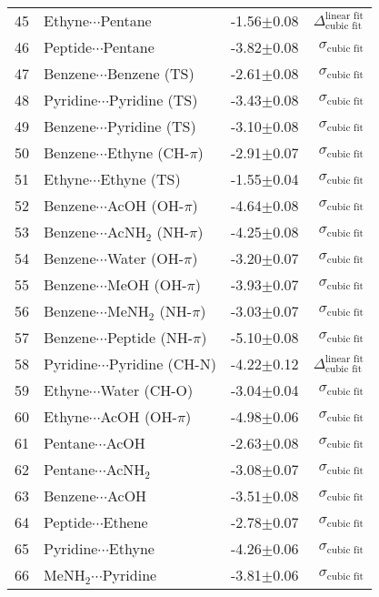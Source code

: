 \begin{longtable}{llrr}
45 & Ethyne$\cdots$Pentane & -1.56$\pm$0.08 & $\Delta_\text{cubic fit}^\text{linear fit}$ \\
46 & Peptide$\cdots$Pentane & -3.82$\pm$0.08 & $\sigma_\text{cubic fit}$ \\
47 & Benzene$\cdots$Benzene (TS) & -2.61$\pm$0.08 & $\sigma_\text{cubic fit}$ \\
48 & Pyridine$\cdots$Pyridine (TS) & -3.43$\pm$0.08 & $\sigma_\text{cubic fit}$ \\
49 & Benzene$\cdots$Pyridine (TS) & -3.10$\pm$0.08 & $\sigma_\text{cubic fit}$ \\
50 & Benzene$\cdots$Ethyne (CH-$\pi$) & -2.91$\pm$0.07 & $\sigma_\text{cubic fit}$ \\
51 & Ethyne$\cdots$Ethyne (TS) & -1.55$\pm$0.04 & $\sigma_\text{cubic fit}$ \\
52 & Benzene$\cdots$AcOH (OH-$\pi$) & -4.64$\pm$0.08 & $\sigma_\text{cubic fit}$ \\
53 & Benzene$\cdots$AcNH$_2$ (NH-$\pi$) & -4.25$\pm$0.08 & $\sigma_\text{cubic fit}$ \\
54 & Benzene$\cdots$Water (OH-$\pi$) & -3.20$\pm$0.07 & $\sigma_\text{cubic fit}$ \\
55 & Benzene$\cdots$MeOH (OH-$\pi$) & -3.93$\pm$0.07 & $\sigma_\text{cubic fit}$ \\
56 & Benzene$\cdots$MeNH$_2$ (NH-$\pi$) & -3.03$\pm$0.07 & $\sigma_\text{cubic fit}$ \\
57 & Benzene$\cdots$Peptide (NH-$\pi$) & -5.10$\pm$0.08 & $\sigma_\text{cubic fit}$ \\
58 & Pyridine$\cdots$Pyridine (CH-N) & -4.22$\pm$0.12 & $\Delta_\text{cubic fit}^\text{linear fit}$ \\
59 & Ethyne$\cdots$Water (CH-O) & -3.04$\pm$0.04 & $\sigma_\text{cubic fit}$ \\
60 & Ethyne$\cdots$AcOH (OH-$\pi$) & -4.98$\pm$0.06 & $\sigma_\text{cubic fit}$ \\
61 & Pentane$\cdots$AcOH & -2.63$\pm$0.08 & $\sigma_\text{cubic fit}$ \\
62 & Pentane$\cdots$AcNH$_2$ & -3.08$\pm$0.07 & $\sigma_\text{cubic fit}$ \\
63 & Benzene$\cdots$AcOH & -3.51$\pm$0.08 & $\sigma_\text{cubic fit}$ \\
64 & Peptide$\cdots$Ethene & -2.78$\pm$0.07 & $\sigma_\text{cubic fit}$ \\
65 & Pyridine$\cdots$Ethyne & -4.26$\pm$0.06 & $\sigma_\text{cubic fit}$ \\
66 & MeNH$_2$$\cdots$Pyridine & -3.81$\pm$0.06 & $\sigma_\text{cubic fit}$ \\
\end{longtable}